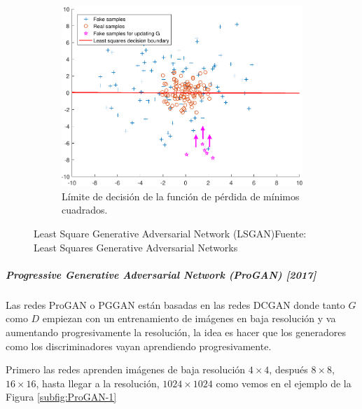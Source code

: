 \begin{figure}[H]
    \begin{subfigure}{.30\linewidth}
        \centering
        \includegraphics[width=0.95\linewidth]{figures/chapter02/boundary_3.pdf}
        \caption{Límite de decisión de la función de pérdida de mínimos cuadrados.}
        \label{subfig:LSGAN-3}
    \end{subfigure}

    \caption{Least Square Generative Adversarial Network (LSGAN)\newline{}Fuente: Least Squares Generative Adversarial Networks \cite{LSGAN-mao2017squares}}
    \label{fig:LSGAN}
\end{figure}



\subparagraph*{Progressive Generative Adversarial Network (ProGAN) [2017]}

Las redes \gls{ProGAN} o \gls{PGGAN} \cite{ProGAN-karras2018progressive} están basadas en las redes \gls{DCGAN} donde tanto ${G}$ como ${D}$ empiezan con un entrenamiento de imágenes en baja resolución y va aumentando progresivamente la resolución, la idea es hacer que los generadores como los discriminadores vayan aprendiendo progresivamente.

Primero las redes aprenden imágenes de baja resolución ${4 \times 4}$, después ${8 \times 8}$, ${16 \times 16}$, hasta llegar a la resolución, ${1024 \times 1024}$ como vemos en el ejemplo de la Figura \ref{subfig:ProGAN-1}

